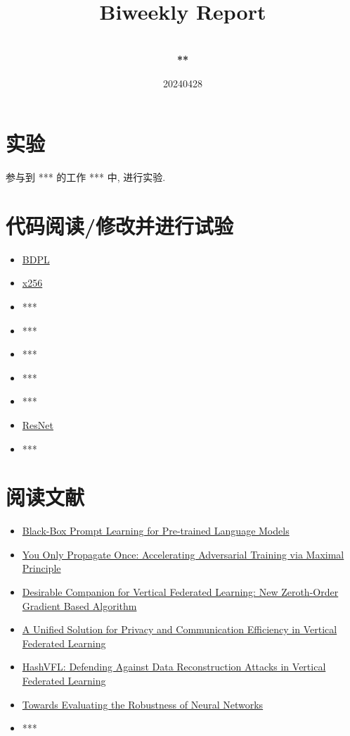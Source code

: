 \documentclass[a4paper]{article}
\title{
    \vspace*{1.0in}
     \\
    \vspace*{1in}
    \textbf{\Huge Biweekly Report}
    \vspace{0.5in}
}
\author{ \\
    \textbf{\huge ***} \\
    \vspace*{1in}
}
\date{\LARGE 20240428}
\begin{document}
\LARGE

\maketitle
\tableofcontents
\thispagestyle{empty}
\newpage


\section{实验}

参与到 *** 的工作 *** 中, 进行实验.


\section{代码阅读/修改并进行试验}

\begin{itemize}
    \item \href{https://github.com/shizhediao/Black-Box-Prompt-Learning}{BDPL}
    \item \href{https://github.com/magarcia/python-x256}{x256}
    \item ***
    \item ***
    \item ***
    \item ***
    \item ***
    \item \href{https://github.com/pytorch/vision/blob/main/torchvision/models/resnet.py}{ResNet}
    \item ***
\end{itemize}


\section{阅读文献}

\begin{itemize}
    \item \href{https://arxiv.org/abs/2201.08531}{Black-Box Prompt Learning for Pre-trained Language Models}
    \item \href{https://arxiv.org/abs/1905.00877}{You Only Propagate Once: Accelerating Adversarial Training via Maximal Principle}
    \item \href{https://arxiv.org/abs/2203.10329}{Desirable Companion for Vertical Federated Learning: New Zeroth-Order Gradient Based Algorithm }
    \item \href{https://neurips.cc/virtual/2023/poster/72535}{A Unified Solution for Privacy and Communication Efficiency in Vertical Federated Learning}
    \item \href{https://arxiv.org/abs/2212.00325}{HashVFL: Defending Against Data Reconstruction Attacks in Vertical Federated Learning}
    \item \href{https://arxiv.org/abs/1608.04644}{Towards Evaluating the Robustness of Neural Networks}
    \item ***
\end{itemize}
\end{document}
